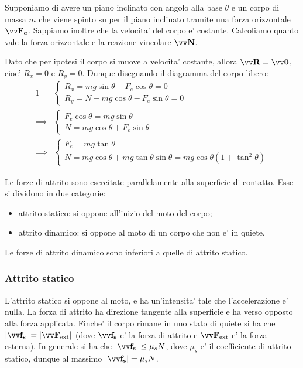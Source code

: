 \begin{example}
    Supponiamo di avere un piano inclinato con angolo alla base $\theta$ e un corpo di massa $m$ che viene spinto su per il piano inclinato tramite una forza orizzontale $\bvv{F_e}$. Sappiamo inoltre che la velocita' del corpo e' costante. Calcoliamo quanto vale la forza orizzontale e la reazione vincolare $\bvv{N}$.

    Dato che per ipotesi il corpo si muove a velocita' costante, allora $\bvv{R} = \bvv{0}$, cioe' $R_x = 0$ e $R_y = 0$. Dunque disegnando il diagramma del corpo libero:
    \begin{alignat*}{1}
        &\begin{cases}
            R_x = mg\sin\theta - F_e\cos\theta = 0\\
            R_y = N - mg\cos\theta - F_e\sin\theta = 0
        \end{cases} \\
        \implies &\begin{cases}
            F_e\cos\theta = mg\sin\theta\\
            N = mg\cos\theta + F_e\sin\theta
        \end{cases} \\
        \implies &\begin{cases}
            F_e = mg\tan\theta\\
            N = mg\cos\theta + mg\tan\theta \sin\theta = mg\cos\theta (1 + \tan^2 \theta)
        \end{cases}
    \end{alignat*}
\end{example}

Le forze di attrito sono esercitate parallelamente alla superficie di contatto. Esse si dividono in due categorie: \begin{itemize}
    \item attrito statico: si oppone all'inizio del moto del corpo;
    \item attrito dinamico: si oppone al moto di un corpo che non e' in quiete.
\end{itemize}
Le forze di attrito dinamico sono inferiori a quelle di attrito statico.

\subsubsection{Attrito statico}

L'attrito statico si oppone al moto, e ha un'intensita' tale che l'accelerazione e' nulla. La forza di attrito ha direzione tangente alla superficie e ha verso opposto alla forza applicata. Finche' il corpo rimane in uno stato di quiete si ha che $\vmag{f_s} = \vmag{F_{\text{ext}}}$ (dove $\bvv{f_s}$ e' la forza di attrito e $\bvv{F_{\text{ext}}}$ e' la forza esterna). 
In generale si ha che $\vmag{f_s} \leq \mu_s N$, dove $\mu_s$ e' il coefficiente di attrito statico, dunque al massimo $\vmag{f_s} = \mu_s N$.

